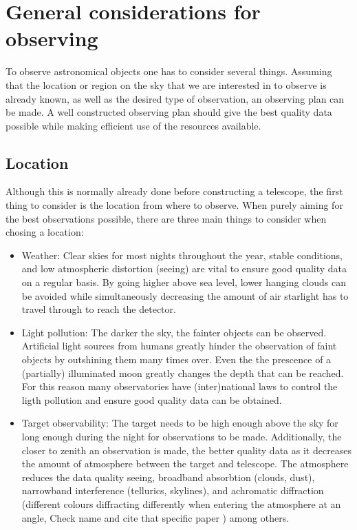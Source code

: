 \documentclass[a4paper,oneside,12pt, class=Latex/Classes/PhDthesisPSnPDF, crop=false]{standalone}
\begin{document}
\section{General considerations for observing}
To observe astronomical objects one has to consider several things. Assuming that the location or region on the sky that we are interested in to observe is already known, as well as the desired type of observation, an observing plan can be made. A well constructed observing plan should give the best quality data possible while making efficient use of the resources available.


\subsection{Location}
Although this is normally already done before constructing a telescope, the first thing to consider is the location from where to observe. When purely aiming for the best observations possible, there are three main things to consider when chosing a location:
\begin{itemize}
	\item {Weather: Clear skies for most nights throughout the year, stable conditions, and low atmospheric distortion (seeing) are vital to ensure good quality data on a regular basis. By going higher above sea level, lower hanging clouds can be avoided while simultaneously decreasing the amount of air starlight has to travel through to reach the detector.}
	\item {Light pollution: The darker the sky, the fainter objects can be observed. Artificial light sources from humans greatly hinder the observation of faint objects by outshining them many times over. Even the the prescence of a (partially) illuminated moon greatly changes the depth that can be reached. For this reason many observatories have (inter)national laws to control the ligth pollution and ensure good quality data can be obtained.}
	\item {Target observability: The target needs to be high enough above the sky for long enough during the night for observations to be made. Additionally, the closer to zenith an observation is made, the better quality data as it decreases the amount of atmosphere between the target and telescope. The atmosphere reduces the data quality seeing, broadband absorbtion (clouds, dust), narrowband interference (tellurics, skylines), and achromatic diffraction (different colours diffracting differently when entering the atmosphere at an angle, \color{red} Check name and cite that specific paper \color{black}) among others.}
\end{itemize}
\end{document}
